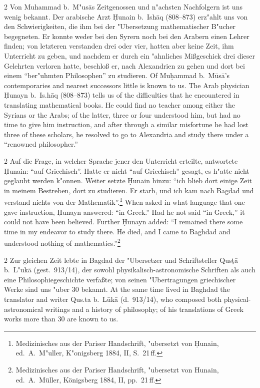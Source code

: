 \documentclass[10pt,a4paper]{article}
\renewcommand{\switchcolumn}{\syncronize\nointerlineskip\columnbreak}
\newcommand{\enquote}[1]{``#1''}
\begin{document}
\begin{paracol}{2}
Von Muhammad b.\ M"us\=as Zeitgenossen und n"achsten Nachfolgern ist uns wenig bekannt. Der arabische Arzt \d{H}unain b.\ Ish\=aq (808--873) erz"ahlt uns von den Schwierigkeiten, die ihm bei der "Ubersetzung mathematischer B"ucher begegneten. Er konnte weder bei den Syrern noch bei den Arabern einen Lehrer finden; von letzteren verstanden drei oder vier, hatten aber keine Zeit, ihm Unterricht zu geben, und nachdem er durch ein "ahnliches Mi\ss{}geschick drei dieser Gelehrten verloren hatte, beschlo\ss{} er, nach Alexandrien zu gehen und dort bei einem \enquote{ber"uhmten Philosophen} zu studieren.
\switchcolumn
Of Mu\d{h}ammad b.\ M\=us\=a's contemporaries and nearest successors little is known to us. The Arab physician \d{H}unayn b.\ Is.h\=aq (808--873) tells us of the difficulties that he encountered in translating mathematical books. He could find no teacher among either the Syrians or the Arabs; of the latter, three or four understood him, but had no time to give him instruction, and after through a similar misfortune he had lost three of these scholars, he resolved to go to Alexandria and study there under a ``renowned philosopher.''
\end{paracol}

\begin{paracol}{2}
Auf die Frage, in welcher Sprache jener den Unterricht erteilte, antwortete \d{H}unain: \enquote{auf Griechisch}. Hatte er nicht \enquote{auf Griechisch} gesagt, es h"atte nicht geglaubt werden k"onnen. Weiter setzte \d{H}unain hinzu: \enquote{ich blieb dort einige Zeit in meinem Bestreben, dort zu studieren. Er starb, und ich kam nach Bagdad und verstand nichts von der Mathematik}.\footnote{Medizinisches aus der Pariser Handschrift, "ubersetzt von \d{H}unain, ed.\ A.\ M"uller, K"onigsberg 1884, II, S.\ 21\,ff.}
\switchcolumn
When asked in what language that one gave instruction, \d{H}unayn answered: ``in Greek.'' Had he not said ``in Greek,'' it could not have been believed. Further \d{H}unayn added: ``I remained there some time in my endeavor to study there. He died, and I came to Baghdad and understood nothing of mathematics.''\footnote{Medizinisches aus der Pariser Handschrift, "ubersetzt von Hunain, ed.\ A.\ M\"uller, K\"onigsberg 1884, II, pp.\ 21\,ff.}
\end{paracol}

\begin{paracol}{2}
Zur gleichen Zeit lebte in Bagdad der "Ubersetzer und Schriftsteller Qus\d{t}\=a b.\ L"uk\=a (gest.\ 913/14), der sowohl physikalisch-astronomische Schriften als auch eine Philosophiegeschichte verfa\ss{}te; von seinen "Ubertragungen griechischer Werke sind uns "uber 30 bekannt.
\switchcolumn
At the same time lived in Baghdad the translator and writer Qus.ta b.\ L\=uk\=a (d.\ 913/14), who composed both physical-astronomical writings and a history of philosophy; of his translations of Greek works more than 30 are known to us.
\end{paracol}
\end{document}
